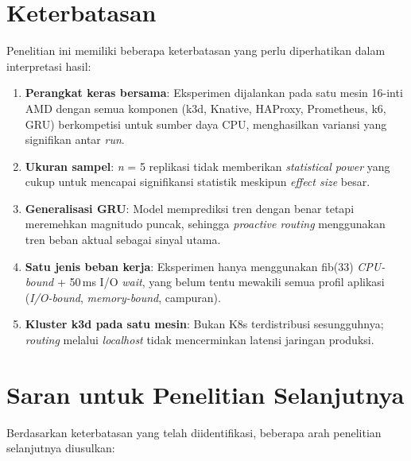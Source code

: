 \section{Keterbatasan}
\label{sec:keterbatasan}

Penelitian ini memiliki beberapa keterbatasan yang perlu diperhatikan dalam interpretasi hasil:

\begin{enumerate}
    \item \textbf{Perangkat keras bersama}: Eksperimen dijalankan pada satu mesin 16-inti AMD dengan semua komponen (k3d, Knative, HAProxy, Prometheus, k6, GRU) berkompetisi untuk sumber daya CPU, menghasilkan variansi yang signifikan antar \emph{run}.

    \item \textbf{Ukuran sampel}: \emph{n} = 5 replikasi tidak memberikan \emph{statistical power} yang cukup untuk mencapai signifikansi statistik meskipun \emph{effect size} besar.

    \item \textbf{Generalisasi GRU}: Model memprediksi tren dengan benar tetapi meremehkan magnitudo puncak, sehingga \emph{proactive routing} menggunakan tren beban aktual sebagai sinyal utama.

    \item \textbf{Satu jenis beban kerja}: Eksperimen hanya menggunakan fib(33) \emph{CPU-bound} + 50\,ms I/O \emph{wait}, yang belum tentu mewakili semua profil aplikasi (\emph{I/O-bound}, \emph{memory-bound}, campuran).

    \item \textbf{Kluster k3d pada satu mesin}: Bukan K8s terdistribusi sesungguhnya; \emph{routing} melalui \emph{localhost} tidak mencerminkan latensi jaringan produksi.
\end{enumerate}

\section{Saran untuk Penelitian Selanjutnya}
\label{sec:saran}

Berdasarkan keterbatasan yang telah diidentifikasi, beberapa arah penelitian selanjutnya diusulkan:

